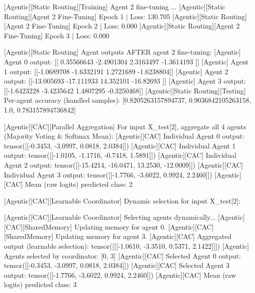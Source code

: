 [Agentic][Static Routing][Training] Agent 2 fine-tuning ...
[Agentic][Static Routing][Agent 2 Fine-Tuning] Epoch 1 | Loss: 130.705
[Agentic][Static Routing][Agent 2 Fine-Tuning] Epoch 2 | Loss: 0.000
[Agentic][Static Routing][Agent 2 Fine-Tuning] Epoch 3 | Loss: 0.000

[Agentic][Static Routing] Agent outputs AFTER agent 2 fine-tuning:
[Agentic] Agent 0 output: [[ 0.35566643 -2.4901304   2.3163497  -1.3614193 ]]
[Agentic] Agent 1 output: [[-1.0689708 -1.6332191  1.2721689 -1.6238804]]
[Agentic] Agent 2 output: [[-13.005693 -17.111933  14.352101 -16.82693 ]]
[Agentic] Agent 3 output: [[-1.6423228 -3.4235642  1.4807295 -0.3250468]]
[Agentic][Static Routing][Testing] Per-agent accuracy (handled samples): [0.8205263157894737, 0.9036842105263158, 1.0, 0.783157894736842]

[Agentic][CAC][Parallel Aggregation] For input X_test[2], aggregate all 4 agents (Majority Voting & Softmax Mean):
[Agentic][CAC] Individual Agent 0 output: tensor([[-0.3453, -3.0997,  0.0818,  2.0384]])
[Agentic][CAC] Individual Agent 1 output: tensor([[-1.0105, -1.1716, -0.7418,  1.5891]])
[Agentic][CAC] Individual Agent 2 output: tensor([[-15.4214, -16.0471,  13.2530, -12.0009]])
[Agentic][CAC] Individual Agent 3 output: tensor([[-1.7766, -3.6022,  0.9924,  2.2460]])
[Agentic][CAC] Mean (raw logits) predicted class: 2

[Agentic][CAC][Learnable Coordinator] Dynamic selection for input X_test[2]:

[Agentic][CAC][Learnable Coordinator] Selecting agents dynamically...
[Agentic][CAC][SharedMemory] Updating memory for agent 0.
[Agentic][CAC][SharedMemory] Updating memory for agent 3.
[Agentic][CAC] Aggregated output (learnable selection): tensor([[[-1.0610, -3.3510,  0.5371,  2.1422]]])
[Agentic] Agents selected by coordinator: [0, 3]
[Agentic][CAC] Selected Agent 0 output: tensor([[-0.3453, -3.0997,  0.0818,  2.0384]])
[Agentic][CAC] Selected Agent 3 output: tensor([[-1.7766, -3.6022,  0.9924,  2.2460]])
[Agentic][CAC] Mean (raw logits) predicted class: 3